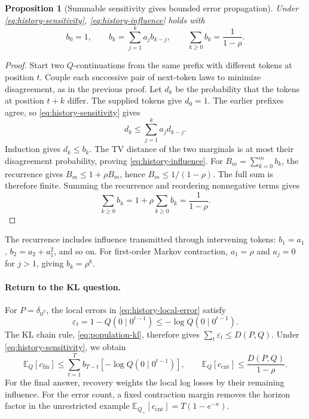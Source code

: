 \documentclass[11pt,twoside]{article}
\newcommand{\E}{\mathbb E}
\newcommand{\KL}{D}
\newtheorem{proposition}[theorem]{Proposition}
\theoremstyle{definition}
\theoremstyle{remark}
\begin{document}
\begin{proposition}[Summable sensitivity gives bounded error propagation]
\label{prop:summable-sensitivity}
Under \cref{eq:history-sensitivity}, \cref{eq:history-influence} holds with
\begin{equation}
 b_0=1,\qquad
 b_k=\sum_{j=1}^k a_jb_{k-j},\qquad
 \sum_{k\ge0}b_k=\frac1{1-\rho}.
 \label{eq:influence-renewal}
\end{equation}
\end{proposition}
\begin{proof}
Start two \(Q\)-continuations from the same prefix with different
tokens at position \(t\). Couple each successive pair of next-token
laws to minimize disagreement, as in the previous proof.
Let \(d_k\) be the probability that the tokens at position \(t+k\)
differ. The supplied tokens give \(d_0=1\).
The earlier prefixes agree, so \cref{eq:history-sensitivity} gives
\[
 d_k\le\sum_{j=1}^k a_jd_{k-j}.
\]
Induction gives \(d_k\le b_k\). The TV distance of the two marginals
is at most their disagreement probability, proving
\cref{eq:history-influence}.
For \(B_m=\sum_{k=0}^m b_k\), the recurrence gives
\(B_m\le1+\rho B_m\), hence \(B_m\le1/(1-\rho)\).
The full sum is therefore finite. Summing the recurrence and
reordering nonnegative terms gives
\[
 \sum_{k\ge0}b_k=1+\rho\sum_{k\ge0}b_k=\frac1{1-\rho}.
\]
\end{proof}

The recurrence includes influence transmitted through intervening tokens:
\(b_1=a_1\), \(b_2=a_2+a_1^2\), and so on.
For first-order Markov contraction, \(a_1=\rho\) and \(a_j=0\)
for \(j>1\), giving \(b_k=\rho^k\).

\paragraph{Return to the KL question.}
For \(P=\delta_{0^T}\), the local errors in
\cref{eq:history-local-error} satisfy
\[
 \varepsilon_t=1-Q(0\mid0^{t-1})
 \le-\log Q(0\mid0^{t-1}).
\]
The KL chain rule, \cref{eq:population-kl}, therefore gives
\(\sum_t\varepsilon_t\le\KL(P,Q)\).
Under \cref{eq:history-sensitivity}, we obtain
\begin{equation}
 \E_Q[c_{\mathrm{fin}}]
 \le\sum_{t=1}^T b_{T-t}[-\log Q(0\mid0^{t-1})],
 \qquad
 \E_Q[c_{\mathrm{cnt}}]\le\frac{\KL(P,Q)}{1-\rho}.
 \label{eq:stable-zero-cost}
\end{equation}
For the final answer, recovery weights the local log losses by their
remaining influence. For the error count, a fixed contraction margin
removes the horizon factor in the unrestricted example
\(\E_{Q_+}[c_{\mathrm{cnt}}]=T(1-e^{-\kappa})\).
\end{document}
